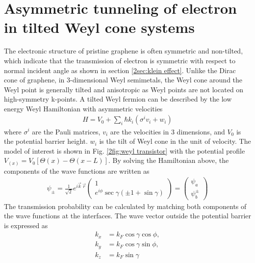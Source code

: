 \section{Asymmetric tunneling of electron in tilted Weyl cone systems} \label{2sec:asymmetric tunneling}
    The electronic structure of pristine graphene is often symmetric and non-tilted, 
    which indicate that the transmission of electron is symmetric with respect to normal incident angle as shown in section \ref{2sec:klein effect}.
    Unlike the Dirac cone of graphene, in 3-dimensional Weyl semimetals, the Weyl cone around the Weyl point is generally tilted and anisotropic as Weyl points are not located on high-symmetry k-points.
    A tilted Weyl fermion can be described by the low energy Weyl Hamiltonian with asymmetric velocities
    \begin{align}\label{2eq:Hamiltonian titled}
        H = V_0 + \sum_{i} \hbar k_i(\sigma^{i} v_i + w_i) 
    \end{align}
    where $\sigma^i$ are the Pauli matrices, $v_i$ are the velocities in 3 dimensions, and $V_0$ is the potential barrier height.
    $w_i$ is the tilt of Weyl cone in the unit of velocity. The model of interest is shown in Fig. \ref{2fig:weyl transistor} with the potential profile $V_{(x)} = V_0[\Theta(x)-\Theta(x-L)]$.
    By solving the Hamiltonian above, the components of the wave functions are written as
    \begin{align} \label{2eq: wave functions}
        \psi_{\pm} = \frac{1}{\sqrt{2}}e^{i \vec{k}\ \vec{r}}
        \begin{pmatrix}
            1 \\
            e^{i \phi} \sec{\gamma (\pm 1 + \sin{\gamma})}
        \end{pmatrix}= 
        \begin{pmatrix}
            \psi_a \\
            \psi_b^{\pm}
        \end{pmatrix}   
    \end{align}
    The transmission probability can be calculated by matching both components of the wave functions at the interfaces.
    The wave vector outside the potential barrier is expressed as
    \begin{equation}\label{2eq:outside wavevector}
        \begin{aligned} 
            k_x &= k_F \cos{\gamma} \cos{\phi},\\
            k_y &= k_F\cos{\gamma} \sin{\phi},\\
            k_z &= k_F \sin{\gamma}\\
        \end{aligned}
    \end{equation}
